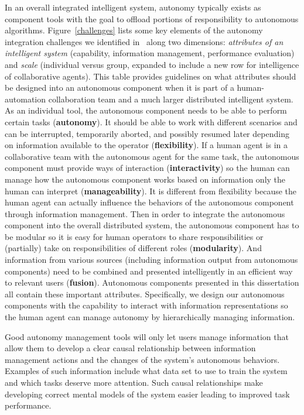 In an overall integrated intelligent system, autonomy typically exists as component tools with the goal to offload portions of responsibility to autonomous algorithms. Figure~\ref{challenges} lists some key elements of the autonomy integration challenges we identified in~\cite{Lin2010Supporting} along two dimensions: \textit{attributes of an intelligent system} (capability, information management, performance evaluation) and \textit{scale} (individual versus group, expanded to include a new row for intelligence of collaborative agents). This table provides guidelines on what attributes should be designed into an autonomous component when it is part of a human-automation collaboration team and a much larger distributed intelligent system. As an individual tool, the autonomous component needs to be able to perform certain tasks (\textbf{autonomy}). It should be able to work with different scenarios and can be interrupted, temporarily aborted, and possibly resumed later depending on information available to the operator (\textbf{flexibility}). If a human agent is in a collaborative team with the autonomous agent for the same task, the autonomous component must provide ways of interaction (\textbf{interactivity}) so the human can manage how the autonomous component works based on information only the human can interpret (\textbf{manageability}). It is different from flexibility because the human agent can actually influence the behaviors of the autonomous component through information management. Then in order to integrate the autonomous component into the overall distributed system, the autonomous component has to be modular so it is easy for human operators to share responsibilities or (partially) take on responsibilities of different roles (\textbf{modularity}). And information from various sources (including information output from autonomous components) need to be combined and presented intelligently in an efficient way to relevant users (\textbf{fusion}). Autonomous components presented in this dissertation all contain these important attributes. Specifically, we design our autonomous components with the capability to interact with information representations so the human agent can manage autonomy by hierarchically managing information. 

Good autonomy management tools will only let users manage information that allow them to develop a clear causal relationship between information management actions and the changes of the system's autonomous behaviors. Examples of such information include what data set to use to train the system and which tasks deserve more attention. Such causal relationships make developing correct mental models of the system easier leading to improved task performance. 


